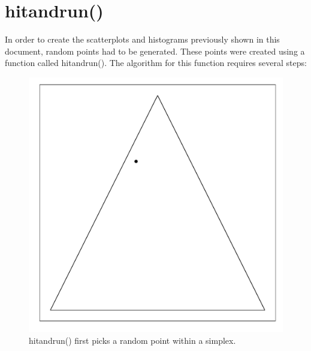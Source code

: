 \documentclass{article}\usepackage{graphicx, color}
\makeatletter
\def\maxwidth{ %
  \ifdim\Gin@nat@width>\linewidth
    \linewidth
  \else
    \Gin@nat@width
  \fi
}
\newenvironment{knitrout}{}{} %
\makeatother
\begin{document}
\section*{hitandrun()}

In order to create the scatterplots and histograms previously shown in this document, random points had to be generated. These points were created using a function called hitandrun(). The algorithm for this function requires several steps:

\begin{figure}[H]
\begin{knitrout}
\color{fgcolor}
\includegraphics[width=\maxwidth]{figure/hitandrun_walkthrough1} 

\end{knitrout}

\caption{hitandrun() first picks a random point within a simplex.}
\end{figure}
\end{document}
